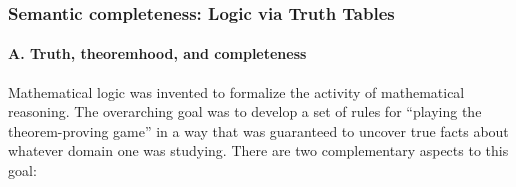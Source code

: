 \subsubsection{Semantic completeness: Logic via Truth Tables}
\label{sec:truth-tables}

\paragraph {A. Truth, theoremhood, and completeness}

Mathematical logic was invented to formalize the activity of mathematical reasoning.  The overarching goal was to develop a set of rules for ``playing the theorem-proving game'' in a way that was guaranteed to uncover true facts about whatever domain one was studying.  There are two complementary aspects to this goal:
